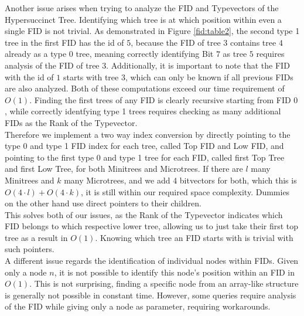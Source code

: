 \documentclass{article}
\begin{document}
Another issue arises when trying to analyze the FID and Typevectors of the Hypersuccinct Tree. Identifying which tree is at which position within even a single FID is not trivial. As demonstrated in Figure \ref{fid:table2}, the second type 1 tree in the first FID has the id of $5$, because the FID of tree $3$ contains tree $4$ already as a type 0 tree, meaning correctly identifying Bit $7$ as tree $5$ requires analysis of the FID of tree $3$. Additionally, it is important to note that the FID with the id of $1$ starts with tree $3$, which can only be known if all previous FIDs are also analyzed. Both of these computations exceed our time requirement of $O(1)$. Finding the first trees of any FID is clearly recursive starting from FID $0$, while correctly identfying type 1 trees requires checking as many additional FIDs as the Rank of the Typevector.\\
Therefore we implement a two way index conversion by directly pointing to the type 0 and type 1 FID index for each tree, called Top FID and Low FID, and pointing to the first type 0 and type 1 tree for each FID, called first Top Tree and first Low Tree, for both Minitrees and Microtrees.
If there are $l$ many Minitrees and $k$ many Microtrees, and we add 4 bitvectors for both, which this is $O(4 \cdot l) + O(4 \cdot k)$, it is still within our required space complexity. Dummies on the other hand use direct pointers to their children.\\
This solves both of our issues, as the Rank of the Typevector indicates which FID belongs to which respective lower tree, allowing us to just take their first top tree as a result in $O(1)$. Knowing which tree an FID starts with is trivial with such pointers.\\
A different issue regards the identification of individual nodes within FIDs. Given only a node $n$, it is not possible to identify this node's position within an FID in $O(1)$. This is not surprising, finding a specific node from an array-like structure is generally not possible in constant time. However, some queries require analysis of the FID while giving only a node as parameter, requiring workarounds.
\end{document}
